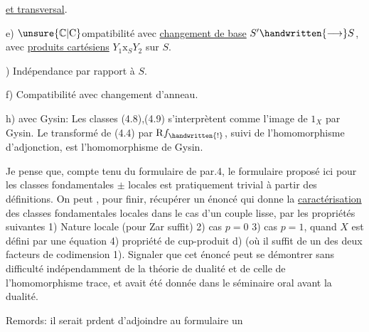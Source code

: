\uline{et transversal}.

 e) $\unsure{\mathbb{C}|\mathrm{C}}$ompatibilité avec \uline{changement de base} $S'\handwritten{\longrightarrow}S$, avec \uline{produits cartésiens} $Y_1\mathbin{\mathrm{x}}_S Y_2$ sur $S$.

) Indépendance par rapport à $S$. 

 f) Compatibilité avec changement d'anneau.

 h)  avec Gysin: Les classes (4.8),(4.9) s'interprètent comme l'image de $1_X$ par Gysin. Le transformé de (4.4) par $\mathrm{R}f_{\handwritten{!}}$, suivi de l'homomorphisme d'adjonction, est l'homomorphisme de Gysin.

Je pense que, compte tenu du formulaire de par.4, le formulaire  proposé ici pour les classes fondamentales $\pm$ locales est pratiquement trivial à partir des définitions. On peut , pour finir, récupérer un énoncé qui donne la \uline{caractérisation} des classes fondamentales locales dans le cas d'un couple lisse, par les propriétés suivantes 1) Nature locale (pour Zar suffit) 2) cas $p=0$ 3) cas $p=1$, quand $X$ est défini par une équation 4) propriété de cup-produit d) (où il suffit de  un des deux facteurs de codimension 1). Signaler que cet énoncé\deleted{\unsure{,}} peut se démontrer sans difficulté indépendamment de la théorie de dualité et de celle de l'homomorphisme trace, et avait été donnée dans le séminaire oral  avant la dualité.

Remords: il serait prdent d'adjoindre au formulaire un

